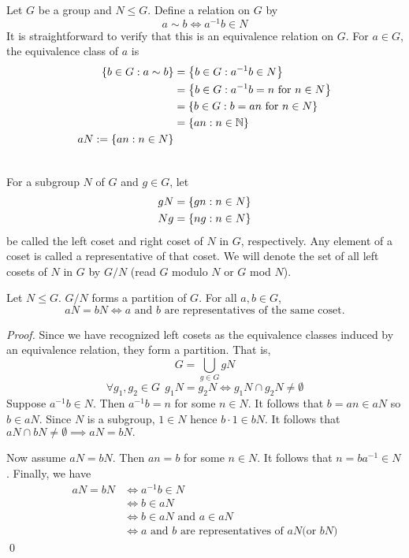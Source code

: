 Let $G$ be a group and $N\leq G$. Define a relation on $G$ by 
$$a \sim b \iff a^{-1}b \in N$$
It is straightforward to verify that this is an equivalence relation on $G$. For $a \in G$, the equivalence class of $a$ is
\begin{align*}
    \left\{b \in G : a \sim b\right\} &= \left\{b \in G : a^{-1}b \in N\right\} \\
    &= \left\{b \in G : a^{-1}b = n \text{ for } n \in N\right\} \\
    &= \left\{b \in G : b = an \text{ for } n \in N\right\} \\
    &= \left\{an : n \in \mathbb{N}\right\} \\
    aN := \left\{an : n \in N\right\}
\end{align*}

\begin{definition} [Coset] \leavevmode \\
    For a subgroup $N$ of $G$ and $g \in G$, let
    \begin{align*}
        gN &= \left\{gn : n \in N\right\} \\
        Ng &= \left\{ng : n \in N\right\}
    \end{align*}
    be called the left coset and right coset of $N$ in $G$, respectively. Any element of a coset is called a representative of that coset. We will denote the set of all left cosets of $N$ in $G$ by $G/N$ (read $G$ modulo $N$ or $G$ mod $N$).
\end{definition}

\begin{proposition}
    \label{prop4}
    Let $N \leq G$. $G/N$ forms a partition of $G$. For all $a,b \in G$, 
    $$aN = bN \iff \text{$a$ and $b$ are representatives of the same coset.}$$
\end{proposition}

\begin{proof}
    Since we have recognized left cosets as the equivalence classes induced by an equivalence relation, they form a partition. That is,
    $$G = \bigcup_{g \in G}gN$$
    $$\forall g_1, g_2 \in G ~~g_1N = g_2N \iff g_1 N \cap g_2 N \not = \emptyset$$
    Suppose $a^{-1}b \in N$. Then $a^{-1}b = n$ for some $n \in N$. It follows that $b = an \in aN$ so $ b\in aN.$ Since $N$ is a subgroup, $1 \in N$ hence $b\cdot 1 \in bN$. It follows that $aN \cap bN \not = \emptyset \implies aN = bN.$

    Now assume $aN = bN$. Then $an = b$ for some $n \in N$. It follows that $n = ba^{-1} \in N$. Finally, we have
    \begin{align*}
        aN = bN &\iff a^{-1}b \in N \\ 
        &\iff b \in aN \\ 
        &\iff b \in aN \text{ and } a \in aN \\
        &\iff a \text{ and } b \text{ are representatives of } aN \text{(or $bN$)}
    \end{align*}
    \qed
\end{proof}

